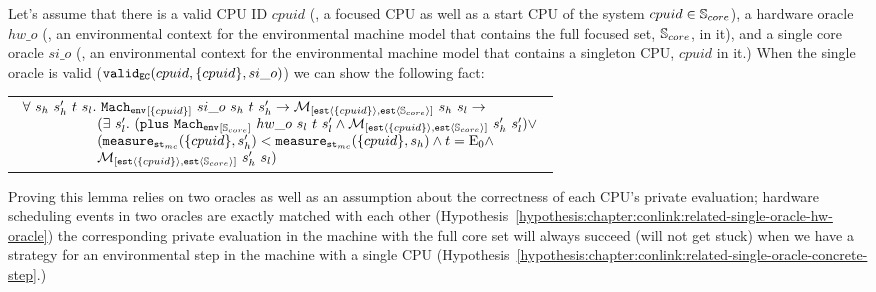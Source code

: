\begin{lemma}
\label{lemma:chapter:conlink:one-env-refines-env}
Let's assume that there is a valid CPU ID $cpuid$ (\ie, a focused CPU as well as a start CPU of the system
$cpuid \in {\mathbb{S}_{core}}$),  a hardware oracle $hw\_o$ (\ie, an environmental context for the environmental machine model that contains the full focused set, ${\mathbb{S}_{core}}$, in it), 
and a single core oracle $si\_o$ (\ie, an environmental context for the environmental machine model that contains a singleton CPU, $cpuid$ in it.)
When the single oracle is valid ($ {{\mathrm{\texttt{valid}}}_{{\mathrm{\texttt{EC}}}}}({cpuid}, {\{cpuid\}}, {si\_o})$) we can show the following fact:
\begin{center}
\begin{tabular}{P{0.95\textwidth}}
$
\begin{array}{l}
\forall \ s_h \ s_h' \ t \ s_l. \ \envstep{\set{cpuid}}{si\_o}{s_h}{t}{s_h'} \rightarrow  \matchestateestate{\set{cpuid}}{s_h}{s_l} \rightarrow \\
\ \ \ \ \ \ \ \ \ \ \ \ \ \ \ \ (\exists \ s_l' .\ (\ccplusstep{\envstep{\coreset}{hw\_o}{s_l}{t}{s_l'}} \wedge \matchestateestate{\set{cpuid}}{s_h'}{s_l'}) \vee \\ 
\ \ \ \ \ \ \ \ \ \ \ \ \ \ \ \ (\mcstatemeasurenoeq{\set{cpuid}}{s_h'} < \mcstatemeasurenoeq{\set{cpuid}}{s_h} \wedge t = \ccemptytrace \wedge \\ 
\ \ \ \ \ \ \ \ \ \ \ \ \ \ \ \ \matchestateestate{\set{cpuid}}{s_h'}{s_l})\\
\end{array}
$
\end{tabular}
\end{center}
\end{lemma}

Proving this lemma relies on two oracles 
as well as an assumption about the correctness of each CPU's private evaluation;
hardware scheduling events in two oracles are exactly matched with each other (Hypothesis~\ref{hypothesis:chapter:conlink:related-single-oracle-hw-oracle})
the corresponding private evaluation in the machine with the full core set
will always succeed (will not get stuck) when we have a strategy for an environmental step in the machine with a single CPU
(Hypothesis~\ref{hypothesis:chapter:conlink:related-single-oracle-concrete-step}.)

